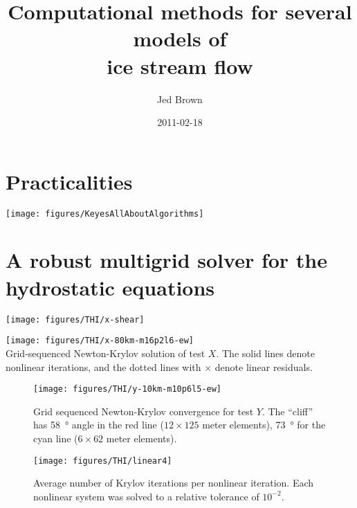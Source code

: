 \documentclass{beamer}
\title{Computational methods for several models of\\ice stream flow}
\author{Jed Brown}
\institute[ETH Z\"urich]
{
  Laboratory of Hydrology, Hydraulics, and Glaciology \\
  ETH Z\"urich
}
\date[2011-02-18]{2011-02-18}
\begin{document}
\lstset{language=C}
\normalem

\begin{frame}
\titlepage
\end{frame}


\section{Practicalities}

\begin{frame}
  \texttt{[image: figures/KeyesAllAboutAlgorithms]}
\end{frame}

\section[Hydrostatic]{A robust multigrid solver for the hydrostatic equations}

%
\begin{frame}
  \texttt{[image: figures/THI/x-shear]}
\end{frame}
\begin{frame}
  \texttt{[image: figures/THI/x-80km-m16p2l6-ew]} \\
  Grid-sequenced Newton-Krylov solution of test $X$.  The solid lines denote nonlinear iterations, and the dotted lines with $\times$ denote linear residuals.
\end{frame}

\begin{frame}
  \begin{figure}
    \texttt{[image: figures/THI/y-10km-m10p6l5-ew]}
    \centering\caption{Grid sequenced Newton-Krylov convergence for test $Y$.
    The ``cliff'' has \SI{58}{\degree} angle in the red line ($12\times 125$ meter elements), \SI{73}{\degree} for the cyan line ($6\times 62$ meter elements).}\label{fig:testy}
  \end{figure}
\end{frame}
\begin{frame}
  \begin{figure}
    \texttt{[image: figures/THI/linear4]}
    \centering\caption{Average number of Krylov iterations per nonlinear iteration.  Each nonlinear system was solved to a relative tolerance of $10^{-2}$.}\label{fig:linear}
  \end{figure}
\end{frame}
\end{document}
